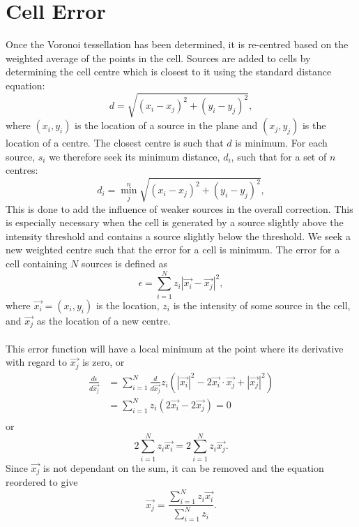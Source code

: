 \section{Cell Error}
Once the Voronoi tessellation has been determined, it is re-centred based on the weighted average of the points in the cell. Sources are added to cells by determining the cell centre which is closest to it using the standard distance equation:
\begin{equation}
d = \sqrt{(x_i - x_j)^2 + (y_i - y_j)^2},
\end{equation}
where $(x_i,y_i)$ is the location of a source in the plane and $(x_j,y_j)$ is the location of a centre. The closest centre is such that $d$ is minimum. For each source, $s_i$ we therefore seek its minimum distance, $d_i$, such that for a set of $n$ centres:
\begin{equation}
d_i = \min^n_j \sqrt{(x_i - x_j)^2 + (y_i - y_j)^2},
\end{equation}
This is done to add the influence of weaker sources in the overall correction. This is especially necessary when the cell is generated by a source slightly above the intensity threshold and contains a source slightly below the threshold. We seek a new weighted centre such that the error for a cell is minimum. The error for a cell containing $N$ sources is defined as
\begin{equation} \label{eq:cellerr}
	\epsilon = \sum^N_{i=1} z_i|\vec{x_i} - \vec{x_j}|^2,
\end{equation}
where $\vec{x_i} = (x_i,y_i)$ is the location, $z_i$ is the intensity of some source in the cell, and $\vec{x_j}$ as the location of a new centre. 
\\
\\
This error function will have a local minimum at the point where its derivative with regard to $\vec{x_j}$ is zero, or
\begin{align*}
	\frac{d\epsilon}{d\vec{x_j}} &= \sum^N_{i=1} \frac{d}{d\vec{x_j}}z_i(|\vec{x_i}|^2 -2\vec{x_i}\cdot\vec{x_j} + |\vec{x_j}|^2) \\
	&= \sum^N_{i=1} z_i(2\vec{x_i} - 2\vec{x_j}) = 0 \\
\end{align*}
or
\begin{equation*}
	2\sum^N_{i=1} z_i\vec{x_i} = 2\sum^N_{i=1}z_i\vec{x_j}.
\end{equation*}
Since $\vec{x_j}$ is not dependant on the sum, it can be removed and the equation reordered to give
\begin{equation}
	\vec{x_j} = \frac{\sum^N_{i=1} z_i\vec{x_i}}{\sum^N_{i=1}z_i}.
\end{equation}
